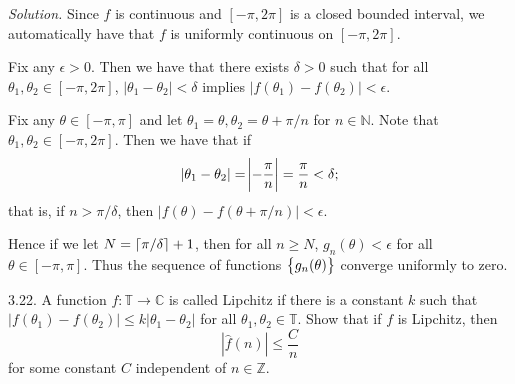 \documentclass{article}
\DeclarePairedDelimiter\ceil{\lceil}{\rceil}
\newcommand{\C}{\mathbb{C}}
\newcommand{\T}{\mathbb{T}}
\newcommand{\N}{\mathbb{N}}
\newcommand{\Z}{\mathbb{Z}}
\begin{document}
\textit{Solution.}
Since $f$ is continuous and $[-\pi, 2\pi]$ is a closed bounded interval,
we automatically have that $f$ is uniformly continuous on $[-\pi, 2\pi]$.

Fix any $\epsilon > 0$. Then we have that there exists $\delta > 0$ such
that for all $\theta_1, \theta_2 \in [-\pi, 2 \pi]$,
$|\theta_1 - \theta_2| < \delta$ implies $|f(\theta_1) - f(\theta_2)| < \epsilon$.

Fix any $\theta \in [-\pi, \pi]$ and let
$\theta_1 = \theta, \theta_2 = \theta + \pi / n$ for $n \in \N$. Note
that $\theta_1, \theta_2 \in [-\pi, 2 \pi]$. Then we have that if
%
\begin{equation*}
    |\theta_1 - \theta_2| = \envert{-\frac{\pi}{n}} = \frac{\pi}{n} < \delta
    ;
\end{equation*}
%
that is, if $n > \pi / \delta$, then
$|f(\theta) - f(\theta + \pi/n)| < \epsilon$.

Hence if we let $N = \ceil{\pi / \delta} + 1$, then for all $n \geq N$,
$g_n(\theta) < \epsilon$ for all $\theta \in [-\pi, \pi]$. Thus the
sequence of functions $\cbr{g_n(\theta)}$ converge uniformly to zero.

\newpage

3.22. A function $f: \T \to \C$ is called Lipchitz if there is a constant $k$ such that
$|f(\theta_1) - f(\theta_2)| \leq k |\theta_1 - \theta_2|$ for all
$\theta_1, \theta_2 \in \T$. Show that if $f$ is Lipchitz, then
%
\begin{equation*}
    |\widehat{f}(n)| \leq \frac{C}{n}
\end{equation*}
%
for some constant $C$ independent of $n \in \Z$.
\end{document}
